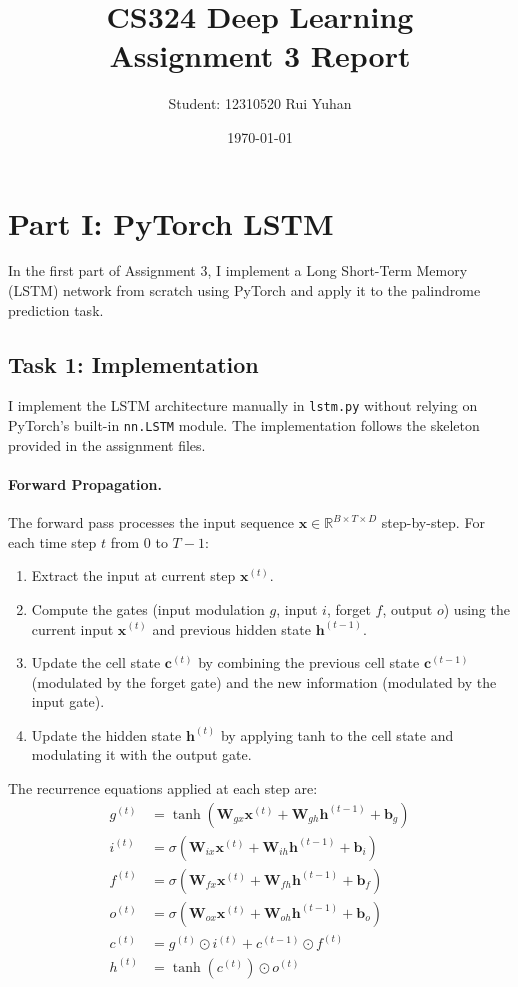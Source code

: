 \documentclass[11pt,a4paper]{article}
\title{
    \textbf{CS324 Deep Learning} \\
    \textbf{Assignment 3 Report}
}
\author{Student: 12310520 Rui Yuhan}
\date{\today}
\begin{document}
\maketitle

\section{Part I: PyTorch LSTM}
In the first part of Assignment 3, I implement a Long Short-Term Memory (LSTM) network from scratch using PyTorch and apply it to the palindrome prediction task.

\subsection{Task 1: Implementation}
I implement the LSTM architecture manually in \texttt{lstm.py} without relying on PyTorch's built-in \texttt{nn.LSTM} module. The implementation follows the skeleton provided in the assignment files.

\paragraph{Forward Propagation.}
The forward pass processes the input sequence $\mathbf{x} \in \mathbb{R}^{B \times T \times D}$ step-by-step. For each time step $t$ from $0$ to $T-1$:
\begin{enumerate}
    \item Extract the input at current step $\mathbf{x}^{(t)}$.
    \item Compute the gates (input modulation $g$, input $i$, forget $f$, output $o$) using the current input $\mathbf{x}^{(t)}$ and previous hidden state $\mathbf{h}^{(t-1)}$.
    \item Update the cell state $\mathbf{c}^{(t)}$ by combining the previous cell state $\mathbf{c}^{(t-1)}$ (modulated by the forget gate) and the new information (modulated by the input gate).
    \item Update the hidden state $\mathbf{h}^{(t)}$ by applying tanh to the cell state and modulating it with the output gate.
\end{enumerate}

The recurrence equations applied at each step are:
\begin{align*}
g^{(t)} &= \tanh(\mathbf{W}_{gx}\mathbf{x}^{(t)} + \mathbf{W}_{gh}\mathbf{h}^{(t-1)} + \mathbf{b}_g) \\
i^{(t)} &= \sigma(\mathbf{W}_{ix}\mathbf{x}^{(t)} + \mathbf{W}_{ih}\mathbf{h}^{(t-1)} + \mathbf{b}_i) \\
f^{(t)} &= \sigma(\mathbf{W}_{fx}\mathbf{x}^{(t)} + \mathbf{W}_{fh}\mathbf{h}^{(t-1)} + \mathbf{b}_f) \\
o^{(t)} &= \sigma(\mathbf{W}_{ox}\mathbf{x}^{(t)} + \mathbf{W}_{oh}\mathbf{h}^{(t-1)} + \mathbf{b}_o) \\
c^{(t)} &= g^{(t)} \odot i^{(t)} + c^{(t-1)} \odot f^{(t)} \\
h^{(t)} &= \tanh(c^{(t)}) \odot o^{(t)}
\end{align*}
\end{document}
